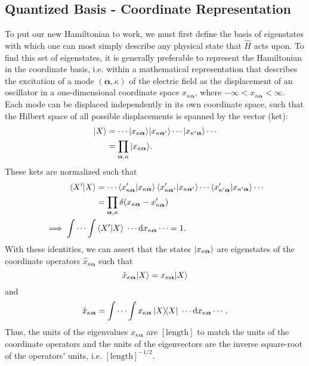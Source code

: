 \documentclass{article}
\numberwithin{equation}{section}
\begin{document}
\subsection{Quantized Basis - Coordinate Representation}

To put our new Hamiltonian to work, we must first define the basis of eigenstates with which one can most simply describe any physical state that $\hat{H}$ acts upon. To find this set of eigenstates, it is generally preferable to represent the Hamiltonian in the coordinate basis, i.e. within a mathematical representation that describes the excitation of a mode $(\bm{\alpha},\kappa)$ of the electric field as the displacement of an oscillator in a one-dimensional coordinate space $x_{\kappa\bm{\alpha}}$, where $-\infty<x_{\kappa\bm{\alpha}}<\infty$. Each mode can be displaced independently in its own coordinate space, such that the Hilbert space of all possible displacements is spanned by the vector (ket):
\begin{equation}
\begin{split}
|{X}\rangle &= \cdots|{x_{\kappa\bm{\alpha}}}\rangle|{x_{\kappa\bm{\alpha}'}}\rangle\cdots|{x_{\kappa'\bm{\alpha}}}\rangle\cdots\\
&= \prod_{\bm{\alpha},\kappa}|{x_{\kappa\bm{\alpha}}}\rangle.
\end{split}
\end{equation}
These kets are normalized such that
\begin{equation}
\begin{split}
\braket{X'}{X} &= \cdots\braket{x'_{\kappa\bm{\alpha}}}{x_{\kappa\bm{\alpha}}}\braket{x'_{\kappa\bm{\alpha}'}}{x_{\kappa\bm{\alpha}'}}\cdots\braket{x'_{\kappa'\bm{\alpha}}}{x_{\kappa'\bm{\alpha}}}\cdots\\
&=\prod_{\bm{\alpha},\kappa}\delta(x_{\kappa\bm{\alpha}} - x'_{\kappa\bm{\alpha}})\\
\implies \int\cdots\int&\braket{X'}{X}\;\cdots\mathrm{d}x_{\kappa\bm{\alpha}}\cdots = 1.
\end{split}
\end{equation}
With these identities, we can assert that the states $|{x_{\kappa\bm{\alpha}}}\rangle$ are eigenstates of the coordinate operators $\hat{x}_{\kappa\bm{\alpha}}$ such that
\begin{equation}
\hat{x}_{\kappa\bm{\alpha}}|{X}\rangle = x_{\kappa\bm{\alpha}}|{X}\rangle
\end{equation}
and
\begin{equation}
\hat{x}_{\kappa\bm{\alpha}} = \int\cdots\int x_{\kappa\bm{\alpha}}\dyad{X}{X}\;\cdots\mathrm{d}x_{\kappa\bm{\alpha}}\cdots.
\end{equation}
Thus, the units of the eigenvalues $x_{\kappa\bm{\alpha}}$ are $[\mathrm{length}]$ to match the units of the coordinate operators and the units of the eigenvectors are the inverse square-root of the operators' units, i.e. $[\mathrm{length}]^{-1/2}$. 
\end{document}
